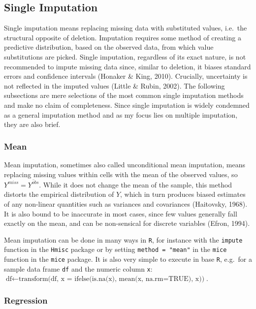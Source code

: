 \documentclass[12pt,econ]{sources/authesis}
\begin{document}
\hypertarget{ordmiss-theory-singimpute}{%
\subsection{Single Imputation}\label{ordmiss-theory-singimpute}}

Single imputation means replacing missing data with substituted values, i.e.~the structural opposite of deletion. Imputation requires some method of creating a predictive distribution, based on the observed data, from which value substitutions are picked. Single imputation, regardless of its exact nature, is not recommended to impute missing data since, similar to deletion, it biases standard errors and confidence intervals (Honaker \& King, 2010). Crucially, uncertainty is not reflected in the imputed values (Little \& Rubin, 2002). The following subsections are mere selections of the most common single imputation methods and make no claim of completeness. Since single imputation is widely condemned as a general imputation method and as my focus lies on multiple imputation, they are also brief.

\hypertarget{ordmiss-theory-impute-mean}{%
\subsubsection{Mean}\label{ordmiss-theory-impute-mean}}

Mean imputation, sometimes also called unconditional mean imputation, means replacing missing values within cells with the mean of the observed values, so \(Y^{miss} = \overline{Y^{obs}}\). While it does not change the mean of the sample, this method distorts the empirical distribution of \(Y\), which in turn produces biased estimates of any non-linear quantities such as variances and covariances (Haitovsky, 1968). It is also bound to be inaccurate in most cases, since few values generally fall exactly on the mean, and can be non-sensical for discrete variables (Efron, 1994).

Mean imputation can be done in many ways in \texttt{R}, for instance with the \texttt{impute} function in the \texttt{Hmisc} package or by setting \texttt{method\ =\ "mean"} in the \texttt{mice} function in the \texttt{mice} package. It is also very simple to execute in base \texttt{R}, e.g.~for a sample data frame \texttt{df} and the numeric column \texttt{x}: \(\text{df} \leftarrow \text{transform(df, x = ifelse(is.na(x), mean(x, na.rm=TRUE), x))}\).

\hypertarget{ordmiss-theory-impute-regress}{%
\subsubsection{Regression}\label{ordmiss-theory-impute-regress}}
\end{document}
